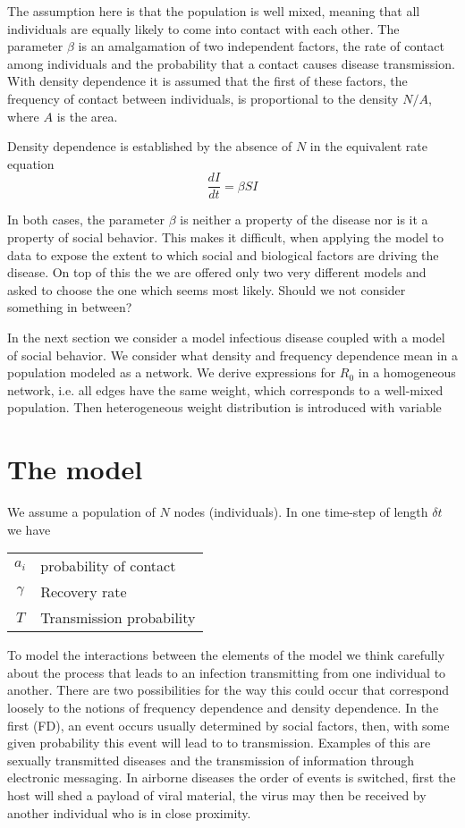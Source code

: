 \documentclass[10pt]{article}
\begin{document}
\begin{multicols}{2}
The assumption here is that the population is well mixed, meaning that all individuals are equally likely to come into contact with each other. The parameter $\beta$ is an amalgamation of two independent factors, the rate of contact among individuals and the probability that a contact causes disease transmission. With density dependence it is assumed that the first of these factors, the frequency of contact between individuals, is proportional to the density $N/A$, where $A$ is the area. 

Density dependence is established by the absence of $N$ in the equivalent rate equation 
\begin{equation}
\frac{dI}{dt}=\beta SI
\end{equation}

In both cases, the parameter $\beta$ is neither a property of the disease nor is it a property of social behavior. This makes it difficult, when applying the model to data to expose the extent to which social and biological factors are driving the disease. On top of this the we are offered only two very different models and asked to choose the one which seems most likely. Should we not consider something in between?

In the next section we consider a model infectious disease coupled with a model of social behavior. We consider what density and frequency dependence mean in a population modeled as a network. We derive expressions for $R_{0}$ in a homogeneous network, i.e. all edges have the same weight, which corresponds to a well-mixed population. Then heterogeneous weight distribution is introduced with variable 

\section{The model}
We assume a population of $N$ nodes (individuals). In one time-step of length $\delta t$ we have 
\begin{center}
\begin{tabular}{c|l}
$a_{i}$& probability of contact\\
$\gamma$& Recovery rate\\
$T$ & Transmission probability
\end{tabular}
\end{center}

To model the interactions between the elements of the model we think carefully about the process that leads to an infection transmitting from one individual to another. There are two possibilities for the way this could occur that correspond loosely to the notions of frequency dependence and density dependence. In the first (FD), an event occurs usually determined by social factors, then, with some given probability this event will lead to to transmission. Examples of this are sexually transmitted diseases and the transmission of information through electronic messaging. In airborne diseases the order of events is switched, first the host will shed a payload of viral material, the virus may then be received by another individual who is in close proximity. 


\end{multicols}
\end{document}

